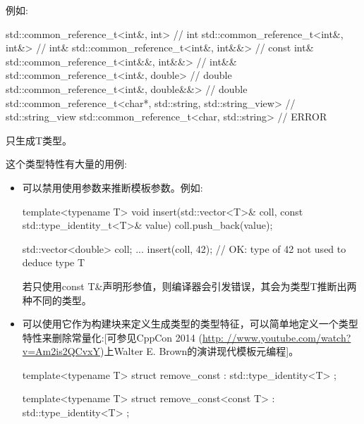 例如:

\begin{cpp}
std::common_reference_t<int&, int> // int
std::common_reference_t<int&, int&> // int&
std::common_reference_t<int&, int&&> // const int&
std::common_reference_t<int&&, int&&> // int&&
std::common_reference_t<int&, double> // double
std::common_reference_t<int&, double&&> // double
std::common_reference_t<char*, std::string, std::string_view> // std::string_view
std::common_reference_t<char, std::string> // ERROR
\end{cpp}



只生成T类型。

这个类型特性有大量的用例:

\begin{itemize}
\item
可以禁用使用参数来推断模板参数。例如:

\begin{cpp}
template<typename T>
void insert(std::vector<T>& coll, const std::type_identity_t<T>& value)
{
	coll.push_back(value);
}

std::vector<double> coll;
...
insert(coll, 42); // OK: type of 42 not used to deduce type T
\end{cpp}

若只使用const T\&声明形参值，则编译器会引发错误，其会为类型T推断出两种不同的类型。

\item
可以使用它作为构建块来定义生成类型的类型特征，可以简单地定义一个类型特性来删除常量化:[可参见CppCon 2014 (\url{http: //www.youtube.com/watch?v=Am2is2QCvxY})上Walter E. Brown的演讲现代模板元编程]。

\begin{cpp}
template<typename T>
struct remove_const : std::type_identity<T> {
};

template<typename T>
struct remove_const<const T> : std::type_identity<T> {
};
\end{cpp}
\end{itemize}




